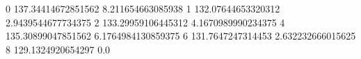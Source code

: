 0 137.34414672851562 8.211654663085938
1 132.07644653320312 2.9439544677734375
2 133.29959106445312 4.1670989990234375
4 135.30899047851562 6.1764984130859375
6 131.7647247314453 2.632232666015625
8 129.1324920654297 0.0
